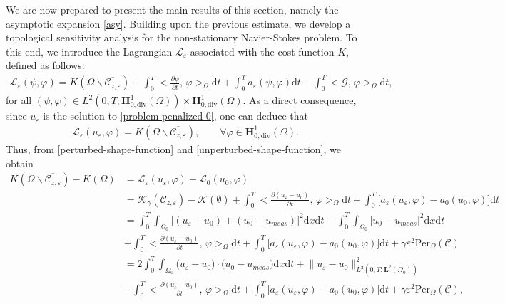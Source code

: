 \documentclass[a4paper,12pt,reqno,natbib]{amsart}
\newcommand{\dx} {\displaystyle\mathrm{d}x}
\newcommand{\dt} {\displaystyle\mathrm{d}t}
\def\K{\mathcal K}
\def\H{\textbf{H}}
\def\L{\textbf{L}}
\begin{document}
We are now prepared to present the main results of this section, namely the asymptotic expansion \eqref{asy}. Building upon the previous estimate, we develop a topological sensitivity analysis for the non-stationary Navier-Stokes problem. To this end, we introduce the Lagrangian \(\mathcal{L}_\varepsilon\) associated with the cost function \(K\), defined as follows:
\begin{align*}
\mathcal{L}_\varepsilon(\psi,\varphi)=K(\Omega\backslash\overline{\mathcal{C}_{z,\varepsilon}})+\int_0^T\displaystyle\big<\frac{\partial \psi}{\partial t},\, \varphi\big>_\Omega\dt+ \int_0^T a_\varepsilon(\psi,\varphi)\dt-\int_0^T \big<\mathcal{G},\, \varphi\big>_\Omega\dt,
\end{align*}
for all $(\psi,\varphi)\in L^2(0,T; \H^1_{0,\text{div}}(\Omega))\times \H^1_{0,\text{div}}(\Omega).$ As a direct consequence, since \(u_\varepsilon\) is the solution to \eqref{problem-penalized-0}, one can deduce that 
\begin{align*}
\mathcal{L}_\varepsilon(u_\varepsilon,\varphi)=K(\Omega\backslash\overline{\mathcal{C}_{z,\varepsilon}}),\qquad\forall\varphi\in \H^1_{0,\text{div}}(\Omega).
\end{align*}
Thus, from \eqref{perturbed-shape-function} and \eqref{unperturbed-shape-function}, we obtain  
\begin{align*}
\nonumber
K(\Omega\backslash\overline{\mathcal{C}_{z,\varepsilon}})-K(\Omega)&=\mathcal{L}_\varepsilon(u_\varepsilon,\varphi)-\mathcal{L}_0(u_0,\varphi)\\
\nonumber&=\K_\gamma(\mathcal{C}_{z,\varepsilon})-\K(\emptyset)+\int_0^T\displaystyle\big<\frac{\partial (u_\varepsilon-u_0)}{\partial t},\, \varphi\big>_\Omega\dt+ \int_0^T \big[a_\varepsilon(u_\varepsilon,\varphi)-a_0(u_0,\varphi)\big]\dt\\
\nonumber&=\int_0^T \int_{\Omega_0}\big|
(u_\varepsilon-u_0)+(u_0-u_{meas})\big|^2 \dx\dt-\int_0^T \int_{\Omega_0}\big|
u_0-u_{meas}\big|^2 \dx\dt\\
&+\int_0^T\big<\frac{\partial (u_\varepsilon-u_0)}{\partial t},\, \varphi\big>_\Omega\dt+ \int_0^T \big[a_\varepsilon(u_\varepsilon,\varphi)-a_0(u_0,\varphi)\big]\dt+\gamma\varepsilon^{2}\text{Per}_\Omega(\mathcal{C})\\
\nonumber&=2\int_0^T \int_{\Omega_0}\big(u_\varepsilon-u_0\big)\cdot\big(u_0-u_{meas}\big) \dx\dt+\big\|
u_\varepsilon-u_0\big\|^2_{L^2(0,T;\L^2(\Omega_0))}\\
&+\int_0^T\big<\frac{\partial (u_\varepsilon-u_0)}{\partial t},\, \varphi\big>_\Omega\dt+\int_0^T \big[a_\varepsilon(u_\varepsilon,\varphi)-a_0(u_0,\varphi)\big]\dt +\gamma\varepsilon^{2}\text{Per}_\Omega(\mathcal{C}),
\end{align*}
\end{document}
